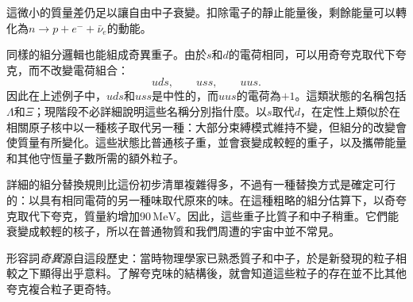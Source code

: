 \begin{classroomqa}
\end{classroomqa}

這微小的質量差仍足以讓自由中子衰變。扣除電子的靜止能量後，剩餘能量可以轉化為\(n\to p+e^-+\bar\nu_e\)的動能。

同樣的組分邏輯也能組成奇異重子。由於\(s\)和\(d\)的電荷相同，可以用奇夸克取代下夸克，而不改變電荷組合：
\begin{equation}
uds,\qquad uss,\qquad uus.
\end{equation}
因此在上述例子中，\(uds\)和\(uss\)是中性的，而\(uus\)的電荷為\(+1\)。這類狀態的名稱包括\(\Lambda\)和\(\Xi\)；現階段不必詳細說明這些名稱分別指什麼。以\(s\)取代\(d\)，在定性上類似於在相關原子核中以一種核子取代另一種：大部分束縛模式維持不變，但組分的改變會使質量有所變化。這些狀態比普通核子重，並會衰變成較輕的重子，以及攜帶能量和其他守恆量子數所需的額外粒子。

\begin{classroomqa}
\end{classroomqa}

詳細的組分替換規則比這份初步清單複雜得多，不過有一種替換方式是確定可行的：以具有相同電荷的另一種味取代原來的味。在這種粗略的組分估算下，以奇夸克取代下夸克，質量約增加\(90\,\mathrm{MeV}\)。因此，這些重子比質子和中子稍重。它們能衰變成較輕的核子，所以在普通物質和我們周遭的宇宙中並不常見。

\begin{classroomqa}
\end{classroomqa}

\begin{classroomqa}
\end{classroomqa}

形容詞\emph{奇異}源自這段歷史：當時物理學家已熟悉質子和中子，於是新發現的粒子相較之下顯得出乎意料。了解夸克味的結構後，就會知道這些粒子的存在並不比其他夸克複合粒子更奇特。

